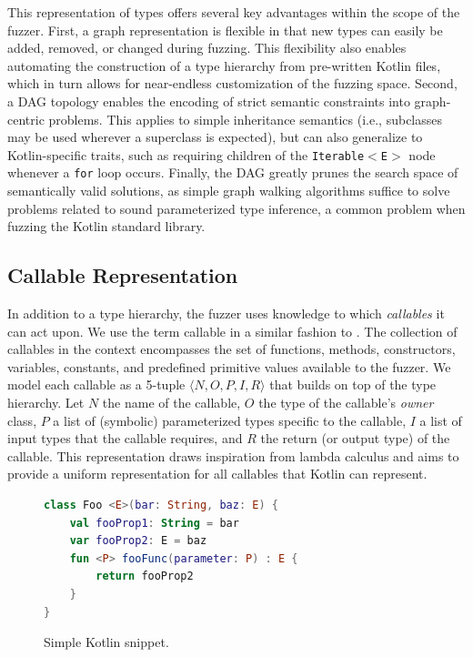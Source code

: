 This representation of types offers several key advantages within the scope of the fuzzer.
First, a graph representation is flexible in that new types can easily be added, removed, or changed
during fuzzing.
This flexibility also enables automating the construction of a type hierarchy
from pre-written Kotlin files, which in turn allows for near-endless customization of the fuzzing space.
Second, a \Gls{DAG} topology enables the encoding of strict semantic constraints into
graph-centric problems.
This applies to simple inheritance semantics
(i.e., subclasses may be used wherever a superclass is expected),
but can also generalize to Kotlin-specific traits,
such as requiring children of the \texttt{Iterable$<$E$>$}
node whenever a \texttt{for} loop occurs.
Finally, the \Gls{DAG} greatly prunes the search space of semantically valid solutions, as simple graph walking
algorithms suffice to solve problems related to sound parameterized type inference, a common problem
when fuzzing the Kotlin standard library.

\subsection{\label{subsec:callables}Callable Representation}
In addition to a type hierarchy, the fuzzer uses knowledge to which \textit{callables}
it can act upon.
We use the term callable in a similar fashion to \citet{stepanov2021type}.
The collection of callables in the context encompasses
the set of functions, methods, constructors, variables, constants, and predefined primitive values
available to the fuzzer.
We model each callable as a 5-tuple $\langle N, O, P, I, R \rangle$ that builds on top of the
type hierarchy.
Let $N$ the name of the callable, $O$ the type of the callable's \textit{owner} class,
$P$ a list of (symbolic) parameterized types specific to the callable,
$I$ a list of input types that the callable requires,
and $R$ the return (or output type) of the callable.
This representation draws inspiration from lambda calculus and aims to provide a uniform representation
for all callables that Kotlin can represent.

\lstset{
  basicstyle=\footnotesize, frame=tb,
  xleftmargin=.2\textwidth, xrightmargin=.2\textwidth,
  numbers=left, stepnumber=1,
}

\begin{figure}
\begin{lstlisting}[language=Kotlin]
class Foo <E>(bar: String, baz: E) {
    val fooProp1: String = bar
    var fooProp2: E = baz
    fun <P> fooFunc(parameter: P) : E {
        return fooProp2
    }
}
\end{lstlisting}
\caption{Simple Kotlin snippet.}
\label{fig:callables}
\end{figure}


